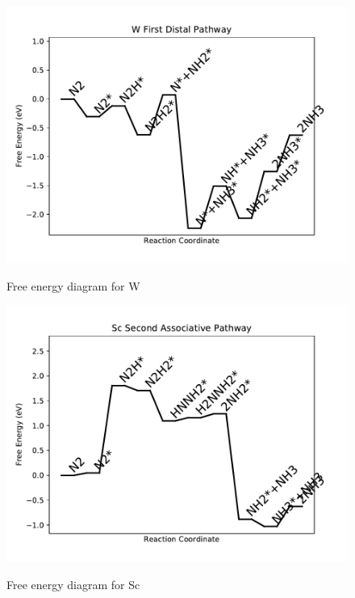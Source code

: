 \documentclass{article}
\begin{document}
\begin{figure}
\includegraphics[width=1\linewidth]{data/plots/W_distal_1.pdf}
\label{fig:W_distal_1}
\caption{Free energy diagram for W}
\end{figure}

\clearpage
\begin{figure}
\includegraphics[width=1\linewidth]{data/plots/Sc_associative_2.pdf}
\label{fig:Sc_associative_2}
\caption{Free energy diagram for Sc}
\end{figure}
\end{document}
